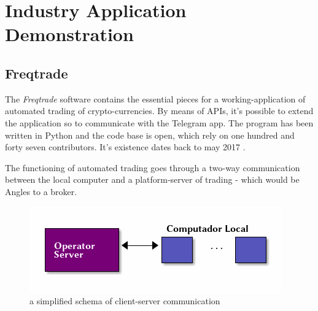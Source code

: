 \documentclass[
12pt,				%
openright,			%
oneside,			%
a4paper,			%
brazil,				%
english,			%
]{abntex2}
\begin{document}
\section{Industry Application Demonstration}
\subsection{Freqtrade}
The \emph{Freqtrade} software contains the essential pieces for a
working-application of automated trading of crypto-currencies. By
means of APIs, it's possible to extend the application so to
communicate with the Telegram app. The program has been written in
Python and the code base is open, which rely on one hundred and
forty seven contributors. It's existence dates back to may 2017 \cite{fang2020cryptocurrency}.

The functioning of automated trading goes through a two-way
communication between the local computer and a platform-server of
trading - which would be Angles to a broker.

\begin{figure}[ht]
  \centering
    \caption{\label{fig:diagrama-freqtrade} a simplified schema of
      client-server communication}
  \includegraphics[width=0.6\linewidth]{Imagens/server-client-fq_4.png}
\end{figure}
\end{document}
